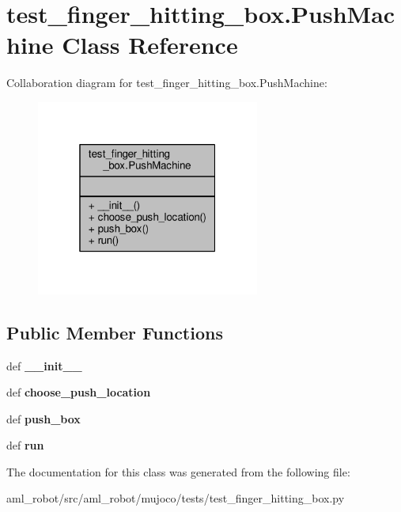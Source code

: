 \hypertarget{classtest__finger__hitting__box_1_1_push_machine}{\section{test\-\_\-finger\-\_\-hitting\-\_\-box.\-Push\-Machine Class Reference}
\label{classtest__finger__hitting__box_1_1_push_machine}
}


Collaboration diagram for test\-\_\-finger\-\_\-hitting\-\_\-box.\-Push\-Machine\-:
\nopagebreak
\begin{figure}[H]
\begin{center}
\leavevmode
\includegraphics[width=208pt]{classtest__finger__hitting__box_1_1_push_machine__coll__graph}
\end{center}
\end{figure}
\subsection*{Public Member Functions}
\begin{DoxyCompactItemize}
\item 
\hypertarget{classtest__finger__hitting__box_1_1_push_machine_ad52ba782f193ab129ffde0c1ddcd0fcc}{def {\bfseries \-\_\-\-\_\-init\-\_\-\-\_\-}}\label{classtest__finger__hitting__box_1_1_push_machine_ad52ba782f193ab129ffde0c1ddcd0fcc}

\item 
\hypertarget{classtest__finger__hitting__box_1_1_push_machine_afaa9aa2694821cd0eb1b92dd6beb60d6}{def {\bfseries choose\-\_\-push\-\_\-location}}\label{classtest__finger__hitting__box_1_1_push_machine_afaa9aa2694821cd0eb1b92dd6beb60d6}

\item 
\hypertarget{classtest__finger__hitting__box_1_1_push_machine_a7384a263cd151b0aba6d76102ab89167}{def {\bfseries push\-\_\-box}}\label{classtest__finger__hitting__box_1_1_push_machine_a7384a263cd151b0aba6d76102ab89167}

\item 
\hypertarget{classtest__finger__hitting__box_1_1_push_machine_a05c2f0b6270bb59ff7f2a4b08401fec3}{def {\bfseries run}}\label{classtest__finger__hitting__box_1_1_push_machine_a05c2f0b6270bb59ff7f2a4b08401fec3}

\end{DoxyCompactItemize}


The documentation for this class was generated from the following file\-:\begin{DoxyCompactItemize}
\item 
aml\-\_\-robot/src/aml\-\_\-robot/mujoco/tests/test\-\_\-finger\-\_\-hitting\-\_\-box.\-py\end{DoxyCompactItemize}
